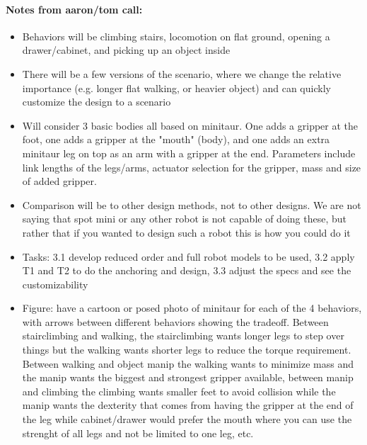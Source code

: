 \documentclass[11pt]{article}
\begin{document}
\paragraph{Notes from aaron/tom call:}
\begin{itemize}
    \item Behaviors will be climbing stairs, locomotion on flat ground, opening a drawer/cabinet, and picking up an object inside
    \item There will be a few versions of the scenario, where we change the relative importance (e.g. longer flat walking, or heavier object) and can quickly customize the design to a scenario
    \item Will consider 3 basic bodies all based on minitaur. One adds a gripper at the foot, one adds a gripper at the "mouth" (body), and one adds an extra minitaur leg on top as an arm with a gripper at the end. Parameters include link lengths of the legs/arms, actuator selection for the gripper, mass and size of added gripper.
    \item Comparison will be to other design methods, not to other designs. We are not saying that spot mini or any other robot is not capable of doing these, but rather that if you wanted to design such a robot this is how you could do it
    \item Tasks: 3.1 develop reduced order and full robot models to be used, 3.2 apply T1 and T2 to do the anchoring and design, 3.3 adjust the specs and see the customizability
    \item Figure: have a cartoon or posed photo of minitaur for each of the 4 behaviors, with arrows between different behaviors showing the tradeoff. Between stairclimbing and walking, the stairclimbing wants longer legs to step over things but the walking wants shorter legs to reduce the torque requirement. Between walking and object manip the walking wants to minimize mass and the manip wants the biggest and strongest gripper available, between manip and climbing the climbing wants smaller feet to avoid collision while the manip wants the dexterity that comes from having the gripper at the end of the leg while cabinet/drawer would prefer the mouth where you can use the strenght of all legs and not be limited to one leg, etc.
\end{itemize}


\end{document}
